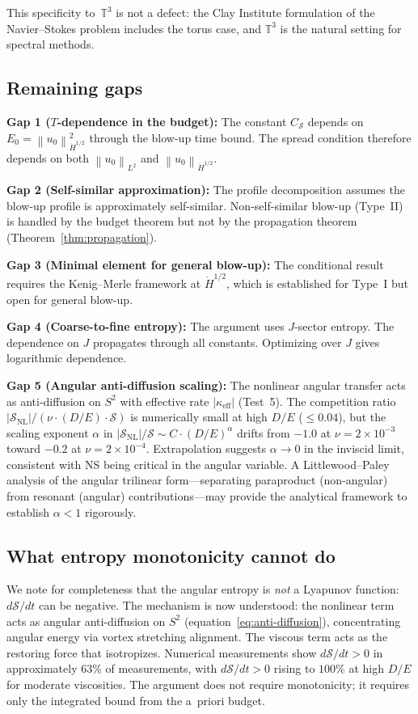 \documentclass[11pt]{article}
\theoremstyle{definition}
\newcommand{\T}{\mathbb{T}}
\newcommand{\norm}[1]{\left\| #1 \right\|}
\newcommand{\Hdot}[1]{\dot{H}^{#1}}
\newcommand{\cS}{\mathcal{S}}
\begin{document}
This specificity to~$\T^3$ is not a defect: the Clay
Institute formulation of the Navier--Stokes problem
includes the torus case, and $\T^3$ is the natural
setting for spectral methods.


\subsection{Remaining gaps}

\textbf{Gap 1 ($T$-dependence in the budget):}
The constant $C_\cS$ depends on $E_0 = \norm{u_0}_{\Hdot{1/2}}^2$
through the blow-up time bound.  The spread condition
therefore depends on both $\norm{u_0}_{L^2}$ and
$\norm{u_0}_{\Hdot{1/2}}$.

\textbf{Gap 2 (Self-similar approximation):}
The profile decomposition assumes the blow-up profile
is approximately self-similar.  Non-self-similar blow-up
(Type~II) is handled by the budget theorem but not by
the propagation theorem (Theorem~\ref{thm:propagation}).

\textbf{Gap 3 (Minimal element for general blow-up):}
The conditional result requires the Kenig--Merle framework
at $\Hdot{1/2}$, which is established for Type~I but open
for general blow-up.

\textbf{Gap 4 (Coarse-to-fine entropy):}
The argument uses $J$-sector entropy.  The dependence on $J$
propagates through all constants.  Optimizing over $J$ gives
logarithmic dependence.

\textbf{Gap 5 (Angular anti-diffusion scaling):}
The nonlinear angular transfer acts as anti-diffusion on $S^2$
with effective rate $|\kappa_{\mathrm{eff}}|$ (Test~5).
The competition ratio
$|\cS_{\mathrm{NL}}|/(\nu\cdot(D/E)\cdot\cS)$ is
numerically small at high $D/E$ ($\leq 0.04$), but the
scaling exponent $\alpha$ in
$|\cS_{\mathrm{NL}}|/\cS \sim C\cdot(D/E)^\alpha$
drifts from $-1.0$ at $\nu = 2\times 10^{-3}$ toward $-0.2$
at $\nu = 2\times 10^{-4}$.  Extrapolation suggests
$\alpha \to 0$ in the inviscid limit, consistent with NS
being critical in the angular variable.
A Littlewood--Paley analysis of the angular trilinear
form---separating paraproduct (non-angular) from resonant
(angular) contributions---may provide the analytical
framework to establish $\alpha < 1$ rigorously.


\subsection{What entropy monotonicity cannot do}

We note for completeness that the angular entropy is
\emph{not} a Lyapunov function: $d\cS/dt$ can be negative.
The mechanism is now understood: the nonlinear term acts as
angular anti-diffusion on $S^2$
(equation~\eqref{eq:anti-diffusion}), concentrating angular
energy via vortex stretching alignment.  The viscous term
acts as the restoring force that isotropizes.  Numerical
measurements show $d\cS/dt > 0$ in approximately $63\%$
of measurements, with $d\cS/dt > 0$ rising to $100\%$ at
high $D/E$ for moderate viscosities.
The argument does not require monotonicity;
it requires only the integrated bound from the a~priori
budget.
\end{document}
